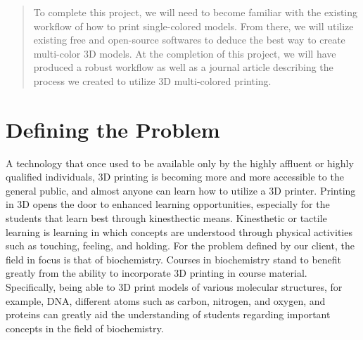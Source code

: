 \documentclass[onecolumn, draftclsnofoot,10pt, compsoc]{IEEEtran}
\begin{document}
\begin{titlepage}
\begin{singlespace}
\begin{abstract}
	    To complete this project, we will need to become familiar with the existing workflow of how to print single-colored models. 
	    From there, we will utilize existing free and open-source softwares to deduce the best way to create multi-color 3D models.
	    At the completion of this project, we will have produced a robust workflow as well as a journal article describing the process we created to utilize 3D multi-colored printing. 

        \end{abstract}     
    \end{singlespace}
\end{titlepage}
\newpage
{}
\tableofcontents
\clearpage


\section{Defining the Problem}
A technology that once used to be available only by the highly affluent or highly qualified individuals, 3D printing is becoming more and more accessible to the general public, and almost anyone can learn how to utilize a 3D printer. 
Printing in 3D opens the door to enhanced learning opportunities, especially for the students that learn best through kinesthectic means.
Kinesthetic or tactile learning is learning in which concepts are understood through physical activities such as touching, feeling, and holding. 
For the problem defined by our client, the field in focus is that of biochemistry. 
Courses in biochemistry stand to benefit greatly from the ability to incorporate 3D printing in course material. 
Specifically, being able to 3D print models of various molecular structures, for example, DNA, different atoms such as carbon, nitrogen, and oxygen, and proteins can greatly aid the understanding of students regarding important concepts in the field of biochemistry.
\end{document}
